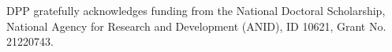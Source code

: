 \documentclass[english]{textolivre}
\begin{document}
\begin{dataavailability}
\end{dataavailability}

\begin{funding}
DPP gratefully acknowledges funding from the National Doctoral Scholarship, National Agency for Research and Development (ANID), ID 10621, Grant No. 21220743.
\end{funding}
\end{document}
